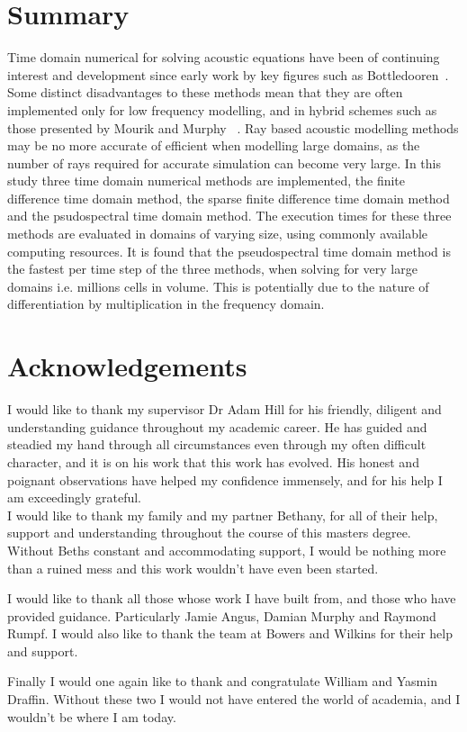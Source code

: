 
%
%
%

\chapter*{Summary}
Time domain numerical for solving acoustic equations have been of continuing interest and development since early work by key figures such as Bottledooren~\cite{Botteldooren1995}. Some distinct disadvantages to these methods mean that they are often implemented only for low frequency modelling, and in hybrid schemes such as those presented by Mourik and Murphy ~\cite{Mourik2014a}. Ray based acoustic modelling methods may be no more accurate of efficient when modelling large domains, as the number of rays required for accurate simulation can become very large. In this study three time domain numerical methods are implemented, the finite difference time domain method, the sparse finite difference time domain method and the psudospectral time domain method. The execution times for these three methods are evaluated in domains of varying size, using commonly available computing resources. It is found that the pseudospectral time domain method is the fastest per time step of the three methods, when solving for very large domains i.e. millions cells in volume. This is potentially due to the nature of differentiation by multiplication in the frequency domain.

\chapter*{Acknowledgements}

I would like to thank my supervisor Dr Adam Hill for his friendly, diligent and understanding guidance throughout my academic career. He has guided and steadied my hand through all circumstances even through my often difficult character, and it is on his work that this work has evolved. His honest and poignant observations have helped my confidence immensely, and for his help I am exceedingly grateful.\\

I would like to thank my family and my partner Bethany, for all of their help, support and understanding throughout the course of this masters degree. Without Beths constant and accommodating support, I would be nothing more than a ruined mess and this work wouldn't have even been started.

I would like to thank all those whose work I have built from, and those who have provided guidance. Particularly Jamie Angus, Damian Murphy and Raymond Rumpf. I would also like to thank the team at Bowers and Wilkins for their help and support.

Finally I would one again like to thank and congratulate William and Yasmin Draffin. Without these two I would not have entered the world of academia, and I wouldn't be where I am today.